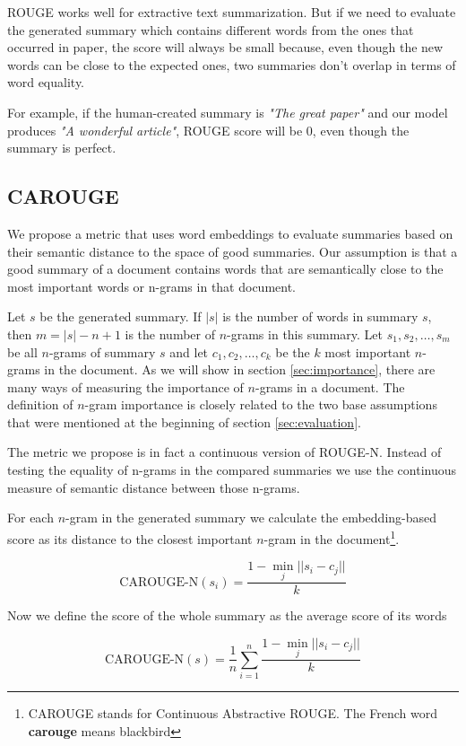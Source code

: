 \documentclass[sigplan]{acmart}
\begin{document}
ROUGE works well for extractive text summarization. But if we need to evaluate the generated summary which contains different words from the ones that occurred in paper, the score will always be small because, even though the new words can be close to the expected ones, two summaries don't overlap in terms of word equality.

For example, if the human-created summary is \textit{"The great paper"} and our model produces \textit{"A wonderful article"}, ROUGE score will be $0$, even though the summary is perfect.

\subsection{CAROUGE}

We propose a metric that uses word embeddings to evaluate summaries based on their semantic distance to the space of good summaries. Our assumption is that a good summary of a document contains words that are semantically close to the most important words or n-grams in that document.

Let $s$ be the generated summary. If $|s|$ is the number of words in summary $s$, then $m=|s|-n+1$ is the number of $n$-grams in this summary. Let $s_1, s_2, \dots, s_m$ be all $n$-grams of summary $s$ and let $c_1, c_2, \dots, c_k$ be the $k$ most important $n$-grams in the document. As we will show in section \ref{sec:importance}, there are many ways of measuring the importance of $n$-grams in a document. The definition of $n$-gram importance is closely related to the two base assumptions that were mentioned at the beginning of section \ref{sec:evaluation}.

The metric we propose is in fact a continuous version of ROUGE-N. Instead of testing the equality of n-grams in the compared summaries we use the continuous measure of semantic distance between those n-grams.

For each $n$-gram in the generated summary we calculate the embedding-based score as its distance to the closest important $n$-gram in the document\footnote{CAROUGE stands for Continuous Abstractive ROUGE. The French word \textbf{carouge} means blackbird}.

\[ \text{CAROUGE-N}(s_i) = \frac{1 - \operatorname*{min}_j ||s_i - c_j||}{k} \]

Now we define the score of the whole summary as the average score of its words

\[ \text{CAROUGE-N}(s) = \frac1n \sum_{i=1}^n \frac{1 - \operatorname*{min}_j ||s_i - c_j||}{k} \]
\end{document}

